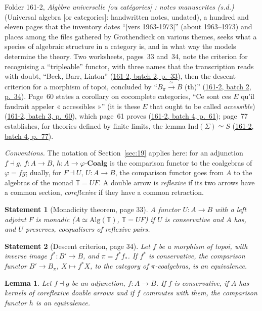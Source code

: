 \documentclass[11pt]{article}
\newcommand{\q}[1]{“#1”}
\newcommand{\lot}[3]{\href{https://grothendieck.commutator.io/\##1/#2/p#3}{#1, batch #2, p.~#3}}
\theoremstyle{plain}
\newtheorem*{enonce}{Statement}
\newtheorem{lemme}{Lemma}[section]
\theoremstyle{definition}
\theoremstyle{remark}
\begin{document}
Folder 161-2, \emph{Algèbre universelle [ou catégories] : notes manuscrites (s.d.)} (Universal algebra [or categories]: handwritten notes, undated), a hundred and eleven pages that the inventory dates \q{[vers 1963-1973]} (about 1963--1973) and places among the files gathered by Grothendieck on various themes, seeks what a species of algebraic structure in a category is, and in what way the models determine the theory. Two worksheets, pages~33 and~34, note the criterion for recognising a \q{tripleable} functor, with three names that the transcription reads with doubt, \q{Beck, Barr, Linton} (\lot{161-2}{2}{33}), then the descent criterion for a morphism of topoi, concluded by \q{$B_\pi \xrightarrow{\ \simeq\ } B$ (th)} (\lot{161-2}{2}{34}). Page~60 states a corollary on cocomplete categories, \q{Ce sont ces $E$ qu'il faudrait appeler « accessibles »} (it is these $E$ that ought to be called \textit{accessible}) (\lot{161-2}{3}{60}), which page~61 proves (\lot{161-2}{4}{61}); page~77 establishes, for theories defined by finite limits, the lemma $\mathrm{Ind}(\Sigma) \simeq S$ (\lot{161-2}{4}{77}).

\noindent\emph{Conventions.} The notation of Section~\ref{sec:19} applies here: for an adjunction $f \dashv g$, $f : A \to B$, $h : A \to \varphi\text{-}\mathbf{Coalg}$ is the comparison functor to the coalgebras of $\varphi = fg$; dually, for $F \dashv U$, $U : A \to B$, the comparison functor goes from $A$ to the algebras of the monad $\mathbb T = UF$. A double arrow is \emph{reflexive} if its two arrows have a common section, \emph{coreflexive} if they have a common retraction.

\begin{enonce}[Monadicity theorem, page 33]
A functor $U : A \to B$ with a left adjoint $F$ is monadic ($A \simeq \mathrm{Alg}(\mathbb T)$, $\mathbb T = UF$) if $U$ is conservative and $A$ has, and $U$ preserves, coequalisers of reflexive pairs.
\end{enonce}

\begin{enonce}[Descent criterion, page 34]
Let $f$ be a morphism of topoi, with inverse image $f^* : B' \to B$, and $\pi = f^* f_*$. If $f^*$ is conservative, the comparison functor $B' \to B_\pi$, $X \mapsto f^* X$, to the category of $\pi$-coalgebras, is an equivalence.
\end{enonce}

\begin{lemme}\label{lem:161-2-grossier}
Let $f \dashv g$ be an adjunction, $f : A \to B$. If $f$ is conservative, if $A$ has kernels of coreflexive double arrows and if $f$ commutes with them, the comparison functor $h$ is an equivalence.
\end{lemme}
\end{document}
